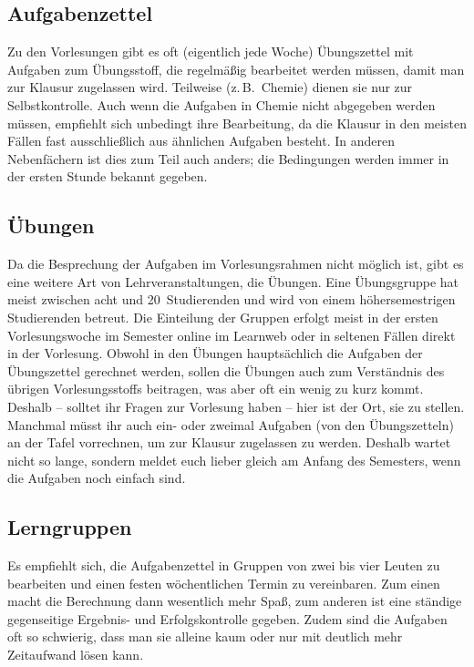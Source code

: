 \begin{multicols}{2}
\subsection{Aufgabenzettel}
Zu den Vorlesungen gibt es oft (eigentlich jede Woche) Übungszettel mit Aufgaben zum Übungsstoff, die regelmäßig bearbeitet werden müssen, damit man zur Klausur zugelassen wird.
Teilweise (z.\,B.\ Chemie) dienen sie nur zur Selbstkontrolle.
Auch wenn die Aufgaben in Chemie nicht abgegeben werden müssen, empfiehlt sich unbedingt ihre Bearbeitung, da die Klausur in den meisten Fällen fast ausschließlich aus ähnlichen Aufgaben besteht.
In anderen Nebenfächern ist dies zum Teil auch anders; die Bedingungen werden immer in der ersten Stunde bekannt gegeben.

\subsection{Übungen}
Da die Besprechung der Aufgaben im Vorlesungsrahmen nicht möglich ist, gibt es eine weitere Art von Lehrveranstaltungen, die Übungen.
Eine Übungsgruppe hat meist zwischen acht und 20~Studierenden und wird von einem höhersemestrigen Studierenden betreut.
Die Einteilung der Gruppen erfolgt meist in der ersten Vorlesungswoche im Semester online im Learnweb oder in seltenen Fällen direkt in der Vorlesung.
Obwohl in den Übungen hauptsächlich die Aufgaben der Übungszettel gerechnet werden, sollen die Übungen auch zum Verständnis des übrigen Vorlesungsstoffs beitragen, was aber oft ein wenig zu kurz kommt.
Deshalb -- solltet ihr Fragen zur Vorlesung haben -- hier ist der Ort, sie zu stellen.
Manchmal müsst ihr auch ein- oder zweimal Aufgaben (von den Übungszetteln) an der Tafel vorrechnen, um zur Klausur zugelassen zu werden.
Deshalb wartet nicht so lange, sondern meldet euch lieber gleich am Anfang des Semesters, wenn die Aufgaben noch einfach sind.

\subsection{Lerngruppen}
Es empfiehlt sich, die Aufgabenzettel in Gruppen von zwei bis vier Leuten zu bearbeiten und einen festen wöchentlichen Termin zu vereinbaren.
Zum einen macht die Berechnung dann wesentlich mehr Spaß, zum anderen ist eine ständige gegenseitige Ergebnis- und Erfolgskontrolle gegeben.
Zudem sind die Aufgaben oft so schwierig, dass man sie alleine kaum oder nur mit deutlich mehr Zeitaufwand lösen kann.


\end{multicols}
